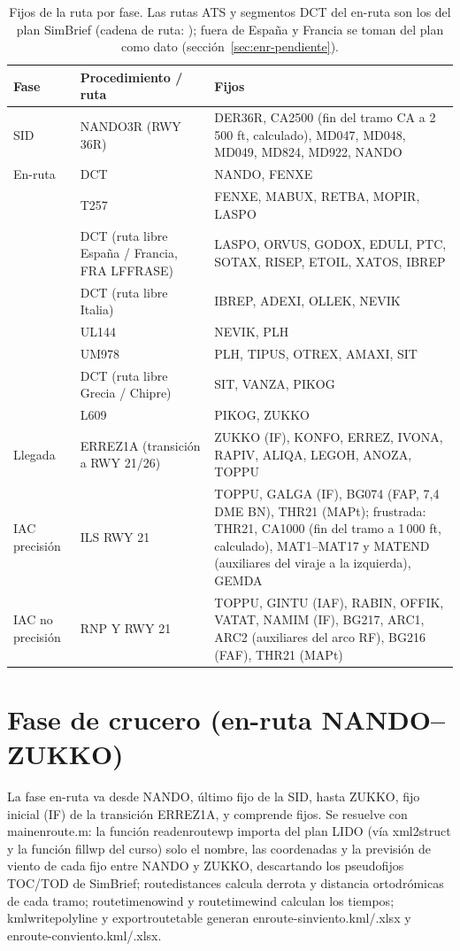 \documentclass[11pt,a4paper]{article}
\DeclareRobustCommand{\m}[1]{{\ttfamily\def\_{\textunderscore\penalty100\relax}#1}}
\begin{document}
\begin{table}[!htbp]\centering\footnotesize
\begin{tabularx}{\linewidth}{lL{3.6cm}Y}\toprule
Fase & Procedimiento / ruta & Fijos\\ \midrule
SID & NANDO3R (RWY 36R) & DER36R, CA2500 (fin del tramo CA a 2\,500 ft, calculado), MD047, MD048, MD049, MD824, MD922, NANDO\\
En-ruta & DCT & NANDO, FENXE\\
 & T257 & FENXE, MABUX, RETBA, MOPIR, LASPO\\
 & DCT (ruta libre España / Francia, FRA LFFRASE) & LASPO, ORVUS, GODOX, EDULI, PTC, SOTAX, RISEP, ETOIL, XATOS, IBREP\\
 & DCT (ruta libre Italia) & IBREP, ADEXI, OLLEK, NEVIK\\
 & UL144 & NEVIK, PLH\\
 & UM978 & PLH, TIPUS, OTREX, AMAXI, SIT\\
 & DCT (ruta libre Grecia / Chipre) & SIT, VANZA, PIKOG\\
 & L609 & PIKOG, ZUKKO\\
Llegada & ERREZ1A (transición a RWY 21/26) & ZUKKO (IF), KONFO, ERREZ, IVONA, RAPIV, ALIQA, LEGOH, ANOZA, TOPPU\\
IAC precisión & ILS RWY 21 & TOPPU, GALGA (IF), BG074 (FAP, 7,4 DME BN), THR21 (MAPt); frustrada: THR21, CA1000 (fin del tramo a 1\,000 ft, calculado), MAT1--MAT17 y MATEND (auxiliares del viraje a la izquierda), GEMDA\\
IAC no precisión & RNP Y RWY 21 & TOPPU, GINTU (IAF), RABIN, OFFIK, VATAT, NAMIM (IF), BG217, ARC1, ARC2 (auxiliares del arco RF), BG216 (FAF), THR21 (MAPt)\\ \bottomrule
\end{tabularx}
\caption{Fijos de la ruta por fase. Las rutas ATS y segmentos DCT del en-ruta son los del plan SimBrief (cadena de ruta: \texttt{\sbRoute}); fuera de España y Francia se toman del plan como dato (sección~\ref{sec:enr-pendiente}).}
\label{tab:fijos}
\end{table}

\section{Fase de crucero (en-ruta NANDO--ZUKKO)}\label{sec:crucero}

La fase en-ruta va desde NANDO, último fijo de la SID, hasta ZUKKO, fijo inicial (IF) de la transición ERREZ1A, y comprende \enrFijos{} fijos. Se resuelve con \m{main\_enroute.m}: la función \m{read\_enroute\_wp} importa del plan LIDO (vía \m{xml2struct} y la función \m{fill\_wp} del curso) solo el nombre, las coordenadas y la previsión de viento de cada fijo entre NANDO y ZUKKO, descartando los pseudofijos TOC/TOD de SimBrief; \m{route\_distances} calcula derrota y distancia ortodrómicas de cada tramo; \m{route\_time\_nowind} y \m{route\_time\_wind} calculan los tiempos; \m{kmlwrite\_polyline} y \m{export\_route\_table} generan \m{enroute-sinviento.kml/.xlsx} y \m{enroute-conviento.kml/.xlsx}.
\end{document}
